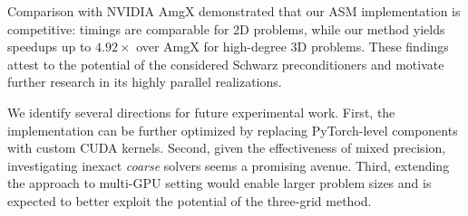 \documentclass[11pt]{article}
\theoremstyle{definition}
\theoremstyle{theorem}
\begin{document}
Comparison with NVIDIA AmgX demonstrated that our ASM implementation is competitive:
timings are comparable for 2D problems, while our method yields speedups up to $4.92\times$
over AmgX for high-degree 3D problems. These findings attest to the potential of the considered Schwarz
preconditioners and motivate further research in its highly parallel realizations.

We identify several directions for future experimental work. First, the
implementation can be further optimized by replacing PyTorch-level components
with custom CUDA kernels. Second, given the effectiveness of mixed precision,
investigating inexact \emph{coarse} solvers seems a promising avenue.
Third, extending the approach to multi-GPU setting \cite{Yamazaki} would enable larger problem
sizes and is expected to better exploit the potential of the three-grid method.

\printbibliography
\end{document}
